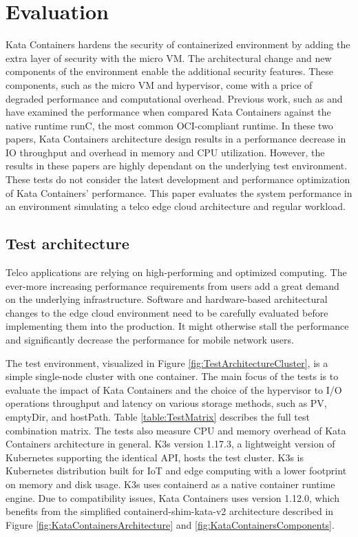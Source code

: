 \chapter{Evaluation}
\label{chapter:evaluation}

Kata Containers hardens the security of containerized environment by adding the extra layer of security with the micro VM. The architectural change and new components of the environment enable the additional security features. These components, such as the micro VM and hypervisor, come with a price of degraded performance and computational overhead. Previous work, such as \cite{EverartsdeVelp2020} and \cite{Kumar2020} have examined the performance when compared Kata Containers against the native runtime runC, the most common OCI-compliant runtime. In these two papers, Kata Containers architecture design results in a performance decrease in IO throughput and overhead in memory and CPU utilization. However, the results in these papers are highly dependant on the underlying test environment. These tests do not consider the latest development and performance optimization of Kata Containers' performance. This paper evaluates the system performance in an environment simulating a telco edge cloud architecture and regular workload.

\section{Test architecture}
\label{section:test_architecture}

Telco applications are relying on high-performing and optimized computing. The ever-more increasing performance requirements from users add a great demand on the underlying infrastructure. Software and hardware-based architectural changes to the edge cloud environment need to be carefully evaluated before implementing them into the production. It might otherwise stall the performance and significantly decrease the performance for mobile network users.

The test environment, visualized in Figure \ref{fig:TestArchitectureCluster}, is a simple single-node cluster with one container. The main focus of the tests is to evaluate the impact of Kata Containers and the choice of the hypervisor to I/O operations throughput and latency on various storage methods, such as PV, emptyDir, and hostPath. Table \ref{table:TestMatrix} describes the full test combination matrix. The tests also measure CPU and memory overhead of Kata Containers architecture in general. K3s\cite{K3s} version 1.17.3, a lightweight version of Kubernetes supporting the identical API, hosts the test cluster. K3s is Kubernetes distribution built for IoT and edge computing with a lower footprint on memory and disk usage. K3s uses containerd as a native container runtime engine. Due to compatibility issues, Kata Containers uses version 1.12.0, which benefits from the simplified containerd-shim-kata-v2 \cite{KataContainersArchitecture} architecture described in Figure \ref{fig:KataContainersArchitecture} and \ref{fig:KataContainersComponents}.

